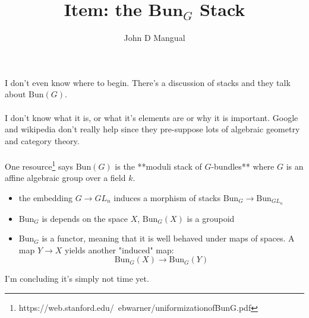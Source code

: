 \documentclass[12pt]{article}
\title{Item: the $\textbf{Bun}_G$ \textbf{Stack}}
\author{John D Mangual}
\date{}
\begin{document}
\selectfont \fontsize{12.5}{15}\selectfont

\maketitle

\noindent I don't even know where to begin.  There's a discussion of stacks and they talk about $\mathrm{Bun}(G)$. \\ \\  I don't know what it is, or what it's elements are or why it is important.  Google and wikipedia don't really help since they pre-suppose lots of algebraic geometry and category theory.  \\ \\
One resource\footnote{https://web.stanford.edu/~ebwarner/uniformizationofBunG.pdf} says $\mathrm{Bun}(G)$ is the **moduli stack of $G$-bundles** where $G$ is an affine algebraic group over a field $k$. 
\begin{itemize}
\item the embedding $G \to GL_n$ induces a morphism of stacks $\mathrm{Bun}_G \to \mathrm{Bun}_{{GL}_n}$
\item $\mathrm{Bun}_G$ is depends on the space $X$, $\mathrm{Bun}_G(X)$ is a groupoid
\item $\mathrm{Bun}_G$ is a functor, meaning that it is well behaved under maps of spaces.  A map $Y \to X$ yields another "induced" map:
$$ \mathrm{Bun}_G(X) \to \mathrm{Bun}_G(Y) $$
\end{itemize}
I'm concluding it's simply not time yet.
\end{document}
